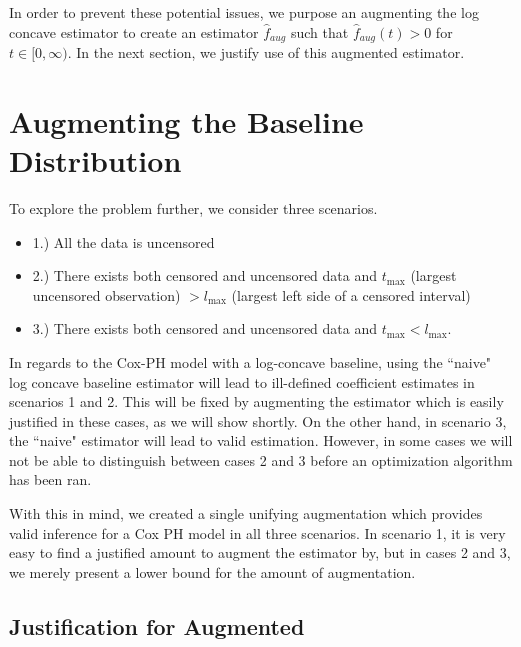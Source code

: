 \documentclass[11pt]{article}
\numberwithin{equation}{section}
\begin{document}
	In order to prevent these potential issues, we purpose an augmenting the log concave estimator to create an estimator $\hat f_{aug}$ such that $\hat f_{aug}(t) > 0$ for $t \in [0, \infty)$. In the next section, we justify use of this augmented estimator. 
	
{\section{Augmenting the Baseline Distribution} 
\label{sec:Augment}} 

	To explore the problem further, we consider three scenarios. 
	
	\begin{itemize}
	
	\item 1.) All the data is uncensored
	
	\item 2.) There exists both censored and uncensored data and $t_{\max}$ (largest uncensored observation) $> l_{\max}$ (largest left side of a censored interval)
	
	\item 3.) There exists both censored and uncensored data and $t_{\max} < l_{\max}$. 
	
	\end{itemize}
	
	In regards to the Cox-PH model with a log-concave baseline, using the ``naive" log concave baseline estimator will lead to ill-defined coefficient estimates in scenarios 1 and 2. This will be fixed by augmenting the estimator which is easily justified in these cases, as we will show shortly. On the other hand, in scenario 3, the ``naive" estimator will lead to valid estimation. However, in some cases we will not be able to distinguish between cases 2 and 3 before an optimization algorithm has been ran. 
	
	With this in mind, we created a single unifying augmentation which provides valid inference for a Cox PH model in all three scenarios. In scenario 1, it is very easy to find a justified amount to augment the estimator by, but in cases 2 and 3, we merely present a lower bound for the amount of augmentation. 
	
	{\subsection{Justification for Augmented}} 
	
\end{document}
